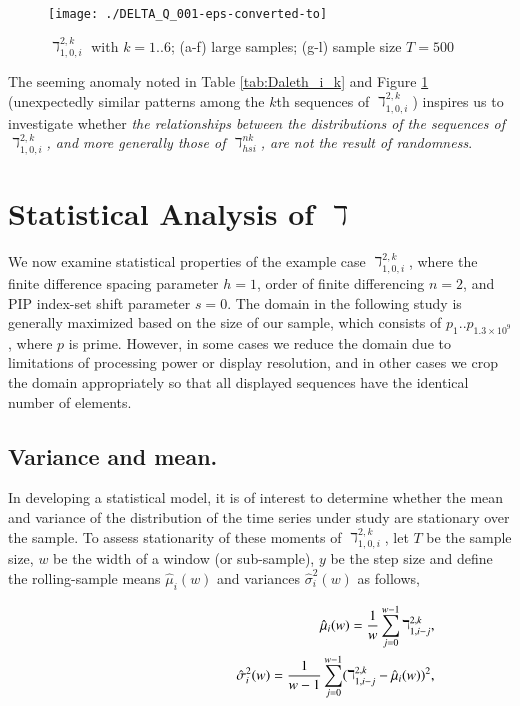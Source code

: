\documentclass[12pt,longtitle,times]{amsart}
\begin{document}
\begin{figure}[hp]
\centering
\texttt{[image: ./DELTA\_Q\_001-eps-converted-to]}
\caption{$\daleth_{1,0,i}^{2,k}$ with $k=1..6$; (a-f) large samples; (g-l) sample size $T = 500$}
\label{fig:DELTA_Q_001}
\end{figure}

\clearpage

The seeming anomaly noted in Table \ref{tab:Daleth_i_k} and Figure \ref{fig:DELTA_Q_001} (unexpectedly similar patterns among the $k$th sequences of $\daleth_{1,0,i}^{2,k}$) inspires us to investigate whether \textit{the relationships between the distributions of the sequences of $\daleth_{1,0,i}^{2,k}$, and more generally those of $\daleth_{hsi}^{nk}$, are not the result of randomness}. 

\section{Statistical Analysis of $\daleth$}
We now examine statistical properties of the example case $\daleth_{1,0,i}^{2,k}$, where the finite difference spacing parameter $h=1$, order of finite differencing $n=2$, and PIP index-set shift parameter $s=0$. The domain in the following study is generally maximized based on the size of our sample, which consists of $p_1..p_{1.3\times{}10^9}$, where $p$ is prime. However, in some cases we reduce the domain due to limitations of processing power or display resolution, and in other cases we crop the domain appropriately so that all displayed sequences have the identical number of elements.

\subsection[short]{Variance and mean.} In developing a statistical model, it is of interest to determine whether the mean and variance of the distribution of the time series under study are stationary over the sample. To assess stationarity of these moments of $\daleth_{1,0,i}^{2,k}$, let $T$ be the sample size, $w$ be the width of a window (or sub-sample), $y$ be the step size and define the rolling-sample means $\hat{\mu}_i(w)$ and variances $\hat{\sigma}_i^2(w)$ as follows,

\begin{eqnarray}
\hphantom{------------}\nonumber&&\hat{\mu}_i(w) = \frac{1}{w}\sum_{j=0}^{w-1}\daleth_{1,i-j}^{2,k}\bigskip,\\
\nonumber&&\hat{\sigma}_i^2(w) = \frac{1}{w-1}\sum_{j=0}^{w-1}(\daleth_{1,i-j}^{2,k}-\hat{\mu}_i(w))^2,
\end{eqnarray}
\end{document}
